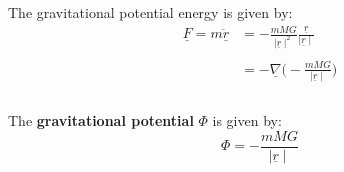 The gravitational potential energy is given by:
$$
	\begin{aligned}
		\underline{F} = m \underline{\ddot{r}} & = -\frac{mMG}{\mid \underline{r}\mid^{2}} \frac{\underline{r}}{\mid \underline{r} \mid } \\ \\
		                                       & = -\underline{\nabla}\Big(-\frac{mMG}{\mid \underline{r}\mid}\Big)                       \\ \\
	\end{aligned}
$$
\begin{definition}
	The {\bf gravitational potential} $\Phi$ is given by:
	\begin{equation}
		\label{eq: gravitational-potential-away-from-earth}
		\Phi = -\frac{mMG}{\mid \underline{r}\mid}
	\end{equation}
\end{definition}
